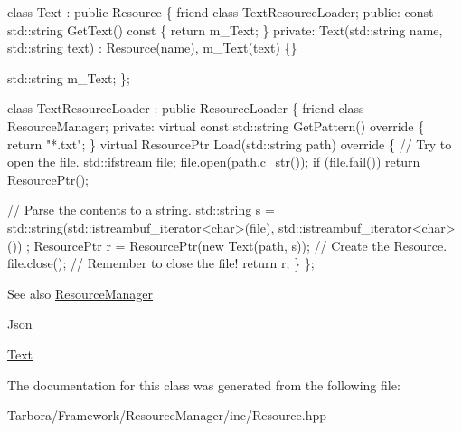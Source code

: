 \begin{DoxyCode}
\textcolor{keyword}{class }Text : \textcolor{keyword}{public} Resource
\{
    \textcolor{keyword}{friend} \textcolor{keyword}{class }TextResourceLoader;
\textcolor{keyword}{public}:
    \textcolor{keyword}{const} std::string GetText()\textcolor{keyword}{ const }\{ \textcolor{keywordflow}{return} m\_Text; \}
\textcolor{keyword}{private}:
    Text(std::string name, std::string text) : Resource(name), m\_Text(text) \{\}

    std::string m\_Text;
\};

\textcolor{keyword}{class }TextResourceLoader : \textcolor{keyword}{public} ResourceLoader
\{
    \textcolor{keyword}{friend} \textcolor{keyword}{class }ResourceManager;
\textcolor{keyword}{private}:
    \textcolor{keyword}{virtual} \textcolor{keyword}{const} std::string GetPattern()\textcolor{keyword}{ override }\{ \textcolor{keywordflow}{return} \textcolor{stringliteral}{"*.txt"}; \}
    \textcolor{keyword}{virtual} ResourcePtr Load(std::string path)\textcolor{keyword}{ override}
\textcolor{keyword}{    }\{
        \textcolor{comment}{// Try to open the file.}
        std::ifstream file;
        file.open(path.c\_str());
        \textcolor{keywordflow}{if} (file.fail())
            \textcolor{keywordflow}{return} ResourcePtr();

        \textcolor{comment}{// Parse the contents to a string.}
        std::string s = std::string(std::istreambuf\_iterator<char>(file), std::istreambuf\_iterator<char>())
      ;
        ResourcePtr r = ResourcePtr(\textcolor{keyword}{new} Text(path, s)); \textcolor{comment}{// Create the Resource.}
        file.close(); \textcolor{comment}{// Remember to close the file!}
        \textcolor{keywordflow}{return} r;
    \}
\};
\end{DoxyCode}


\begin{DoxySeeAlso}{See also}
\hyperlink{classTarbora_1_1ResourceManager}{Resource\+Manager} 

\hyperlink{classTarbora_1_1Json}{Json} 

\hyperlink{classTarbora_1_1Text}{Text} 
\end{DoxySeeAlso}


The documentation for this class was generated from the following file\+:\begin{DoxyCompactItemize}
\item 
Tarbora/\+Framework/\+Resource\+Manager/inc/Resource.\+hpp\end{DoxyCompactItemize}
